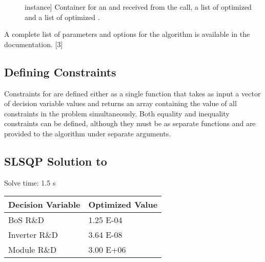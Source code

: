 \documentclass[letterpaper,10pt,english]{sphinxmanual}
\begin{document}
\begin{description}
\item[{}] \leavevmode{[} instance{]}
Container for an  and  received from the
 call, a list of optimized  and
a list of optimized .

\end{description}

A complete list of parameters and options for the 
algorithm is available in the documentation. {[}3{]}


\subsection{Defining Constraints}
\label{\detokenize{optimizers:defining-constraints}}
Constraints for  are defined either as a single function
that takes as input a vector of decision variable values and returns an
array containing the value of all constraints in the problem
simultaneously. Both equality and inequality constraints can be defined,
although they must be as separate functions and are provided to the
 algorithm under separate arguments.


\subsection{SLSQP Solution to }
\label{\detokenize{optimizers:slsqp-solution-to-pv-residential-simple}}
Solve time: 1.5 s


\begin{savenotes}\sphinxattablestart
\centering
\begin{tabulary}{\linewidth}[t]{|T|T|}
\hline
\sphinxstyletheadfamily 
Decision Variable
&\sphinxstyletheadfamily 
Optimized Value
\\
\hline
BoS R\&D
&
1.25 E-04
\\
\hline
Inverter R\&D
&
3.64 E-08
\\
\hline
Module R\&D
&
3.00 E+06
\\
\hline
\end{tabulary}
\par
\sphinxattableend\end{savenotes}
\end{document}

